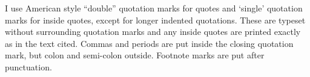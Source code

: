 I use American style ``double'' quotation marks for quotes and
`single' quotation marks for inside quotes, except for longer indented
quotations. These are typeset without surrounding quotation marks and
any inside quotes are printed exactly as in the text cited. Commas and
periods are put inside the closing quotation mark, but colon and
semi-colon outside. Footnote marks are put after punctuation.

